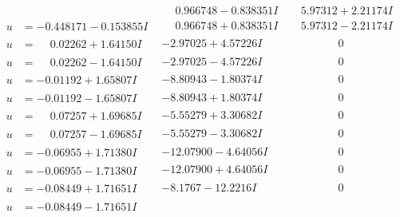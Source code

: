 \documentclass[1p]{elsarticle_modified}
\theoremstyle{definition}
\begin{document}
$$\begin{array}{c|c|c}
 & \phantom{-}0.966748 - 0.838351 I & \phantom{-}5.97312 + 2.21174 I \\ \hline\begin{aligned}
u &= -0.448171 - 0.153855 I\end{aligned}
 & \phantom{-}0.966748 + 0.838351 I & \phantom{-}5.97312 - 2.21174 I \\ \hline\begin{aligned}
u &= \phantom{-}0.02262 + 1.64150 I\end{aligned}
 & -2.97025 + 4.57226 I & \phantom{-0.000000 } 0 \\ \hline\begin{aligned}
u &= \phantom{-}0.02262 - 1.64150 I\end{aligned}
 & -2.97025 - 4.57226 I & \phantom{-0.000000 } 0 \\ \hline\begin{aligned}
u &= -0.01192 + 1.65807 I\end{aligned}
 & -8.80943 - 1.80374 I & \phantom{-0.000000 } 0 \\ \hline\begin{aligned}
u &= -0.01192 - 1.65807 I\end{aligned}
 & -8.80943 + 1.80374 I & \phantom{-0.000000 } 0 \\ \hline\begin{aligned}
u &= \phantom{-}0.07257 + 1.69685 I\end{aligned}
 & -5.55279 + 3.30682 I & \phantom{-0.000000 } 0 \\ \hline\begin{aligned}
u &= \phantom{-}0.07257 - 1.69685 I\end{aligned}
 & -5.55279 - 3.30682 I & \phantom{-0.000000 } 0 \\ \hline\begin{aligned}
u &= -0.06955 + 1.71380 I\end{aligned}
 & -12.07900 - 4.64056 I & \phantom{-0.000000 } 0 \\ \hline\begin{aligned}
u &= -0.06955 - 1.71380 I\end{aligned}
 & -12.07900 + 4.64056 I & \phantom{-0.000000 } 0 \\ \hline\begin{aligned}
u &= -0.08449 + 1.71651 I\end{aligned}
 & -8.1767 - 12.2216 I & \phantom{-0.000000 } 0 \\ \hline\begin{aligned}
u &= -0.08449 - 1.71651 I\end{aligned}

\end{array}$$
\end{document}

